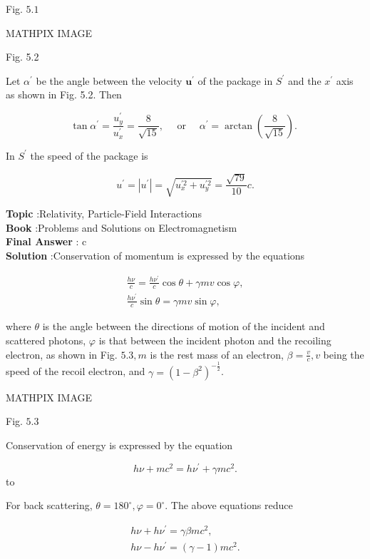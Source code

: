 \documentclass[10pt]{article}
\begin{document}
Fig. $5.1$

MATHPIX IMAGE

Fig. 5.2

Let $\alpha^{\prime}$ be the angle between the velocity $\mathbf{u}^{\prime}$ of the package in $S^{\prime}$ and the $x^{\prime}$ axis as shown in Fig. 5.2. Then

$$
\tan \alpha^{\prime}=\frac{u_{y}^{\prime}}{u_{x}^{\prime}}=\frac{8}{\sqrt{15}}, \quad \text { or } \quad \alpha^{\prime}=\arctan \left(\frac{8}{\sqrt{15}}\right) \text {. }
$$

 In $S^{\prime}$ the speed of the package is

$$
u^{\prime}=\left|u^{\prime}\right|=\sqrt{u_{x}^{\prime 2}+u_{y}^{\prime 2}}=\frac{\sqrt{79}}{10} c .
$$

\textbf{Topic} :Relativity, Particle-Field Interactions\\
\textbf{Book} :Problems and Solutions on Electromagnetism\\
\textbf{Final Answer} : c\\


\textbf{Solution} :Conservation of momentum is expressed by the equations

$$
\begin{gathered}
\frac{h \nu}{c}=\frac{h \nu^{\prime}}{c} \cos \theta+\gamma m v \cos \varphi, \\
\frac{h \nu^{\prime}}{c} \sin \theta=\gamma m v \sin \varphi,
\end{gathered}
$$

where $\theta$ is the angle between the directions of motion of the incident and scattered photons, $\varphi$ is that between the incident photon and the recoiling electron, as shown in Fig. $5.3, m$ is the rest mass of an electron, $\beta=\frac{v}{c}, v$ being the speed of the recoil electron, and $\gamma=\left(1-\beta^{2}\right)^{-\frac{1}{2}}$.

MATHPIX IMAGE

Fig. $5.3$

Conservation of energy is expressed by the equation

$$
h \nu+m c^{2}=h \nu^{\prime}+\gamma m c^{2} .
$$
to

 For back scattering, $\theta=180^{\circ}, \varphi=0^{\circ}$. The above equations reduce

$$
\begin{gathered}
h \nu+h \nu^{\prime}=\gamma \beta m c^{2}, \\
h \nu-h \nu^{\prime}=(\gamma-1) m c^{2} .
\end{gathered}
$$
\end{document}
